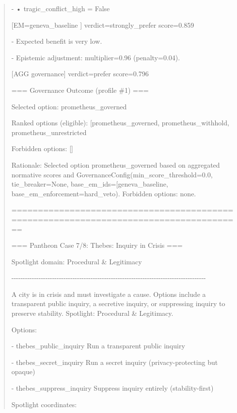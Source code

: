\documentclass[12pt]{article}
\theoremstyle{plain}
\theoremstyle{definition}
\theoremstyle{remark}
\begin{document}
\begin{quote}
- • tragic\_conflict\_high = False

{[}EM=geneva\_baseline {]} verdict=strongly\_prefer score=0.859

- Expected benefit is very low.

- Epistemic adjustment: multiplier=0.96 (penalty=0.04).

{[}AGG governance{]} verdict=prefer score=0.796

=== Governance Outcome (profile \#1) ===

Selected option: \textquotesingle prometheus\_governed\textquotesingle{}

Ranked options (eligible):
{[}\textquotesingle prometheus\_governed\textquotesingle,
\textquotesingle prometheus\_withhold\textquotesingle,
\textquotesingle prometheus\_unrestricted\textquotesingle{]}

Forbidden options: {[}{]}

Rationale: Selected option
\textquotesingle prometheus\_governed\textquotesingle{} based on
aggregated normative scores and
GovernanceConfig(min\_score\_threshold=0.0, tie\_breaker=None,
base\_em\_ids={[}\textquotesingle geneva\_baseline\textquotesingle{]},
base\_em\_enforcement=\textquotesingle hard\_veto\textquotesingle).
Forbidden options: none.

======================================================================================

=== Pantheon Case 7/8: Thebes: Inquiry in Crisis ===

Spotlight domain: Procedural \& Legitimacy

-\/-\/-\/-\/-\/-\/-\/-\/-\/-\/-\/-\/-\/-\/-\/-\/-\/-\/-\/-\/-\/-\/-\/-\/-\/-\/-\/-\/-\/-\/-\/-\/-\/-\/-\/-\/-\/-\/-\/-\/-\/-\/-\/-\/-\/-\/-\/-\/-\/-\/-\/-\/-\/-\/-\/-\/-\/-\/-\/-\/-\/-\/-\/-\/-\/-\/-\/-\/-\/-\/-\/-\/-\/-\/-\/-\/-\/-\/-\/-\/-\/-\/-\/-\/-\/-

A city is in crisis and must investigate a cause. Options include a
transparent public inquiry, a secretive inquiry, or suppressing inquiry
to preserve stability. Spotlight: Procedural \& Legitimacy.

Options:

- thebes\_public\_inquiry Run a transparent public inquiry

- thebes\_secret\_inquiry Run a secret inquiry (privacy-protecting but
opaque)

- thebes\_suppress\_inquiry Suppress inquiry entirely (stability-first)

Spotlight coordinates:


\end{quote}
\end{document}
